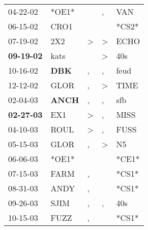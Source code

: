 \begin{supertabular}{p{0.07\textwidth}p{0.06\textwidth}p{0.02\textwidth}p{0.02\textwidth}p{0.06\textwidth}}
          04-22-02\textsuperscript{} &                            *OE1* &                  &             , &   VAN\textsuperscript{} \\
          06-15-02\textsuperscript{} &           CRO1\textsuperscript{} &                  &               &                   *CS2* \\
          07-19-02\textsuperscript{} &            2X2\textsuperscript{} &     \textgreater &  \textgreater &  ECHO\textsuperscript{} \\
 \textbf{09-19-02\textsuperscript{}} &           kats\textsuperscript{} &                  &  \textgreater &   40s\textsuperscript{} \\
          10-16-02\textsuperscript{} &   \textbf{DBK\textsuperscript{}} &                , &             , &  feud\textsuperscript{} \\
          12-12-02\textsuperscript{} &           GLOR\textsuperscript{} &                , &  \textgreater &  TIME\textsuperscript{} \\
          02-04-03\textsuperscript{} &  \textbf{ANCH\textsuperscript{}} &                , &             , &   sfb\textsuperscript{} \\
 \textbf{02-27-03\textsuperscript{}} &            EX1\textsuperscript{} &     \textgreater &             , &  MISS\textsuperscript{} \\
          04-10-03\textsuperscript{} &           ROUL\textsuperscript{} &     \textgreater &             , &  FUSS\textsuperscript{} \\
          05-15-03\textsuperscript{} &           GLOR\textsuperscript{} &                , &  \textgreater &    N5\textsuperscript{} \\
          06-06-03\textsuperscript{} &                            *OE1* &                  &               &                   *CE1* \\
          07-15-03\textsuperscript{} &           FARM\textsuperscript{} &                , &               &                   *CS1* \\
          08-31-03\textsuperscript{} &           ANDY\textsuperscript{} &                , &               &                   *CS1* \\
          09-26-03\textsuperscript{} &           SJIM\textsuperscript{} &                , &             , &   40s\textsuperscript{} \\
          10-15-03\textsuperscript{} &           FUZZ\textsuperscript{} &                , &               &                   *CS1* \\

\end{supertabular}
